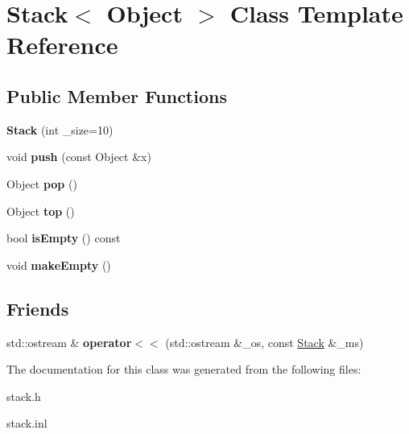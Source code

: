 \hypertarget{class_stack}{}\section{Stack$<$ Object $>$ Class Template Reference}
\label{class_stack}
\subsection*{Public Member Functions}
\begin{DoxyCompactItemize}
\item 
{\bfseries Stack} (int \+\_\+size=10)\hypertarget{class_stack_aa55bea9258de37be8c25a82b2cd8408d}{}\label{class_stack_aa55bea9258de37be8c25a82b2cd8408d}

\item 
void {\bfseries push} (const Object \&x)\hypertarget{class_stack_a7a7712fc7e216d9a5ebdff5e2eb82e64}{}\label{class_stack_a7a7712fc7e216d9a5ebdff5e2eb82e64}

\item 
Object {\bfseries pop} ()\hypertarget{class_stack_a5bcb9219ba7f9bb2d2b350278bebb5f9}{}\label{class_stack_a5bcb9219ba7f9bb2d2b350278bebb5f9}

\item 
Object {\bfseries top} ()\hypertarget{class_stack_afa4b0f96a58c0ad67396a2d3aac635e3}{}\label{class_stack_afa4b0f96a58c0ad67396a2d3aac635e3}

\item 
bool {\bfseries is\+Empty} () const \hypertarget{class_stack_a65317fd9c88beed3aa412ac162d5f897}{}\label{class_stack_a65317fd9c88beed3aa412ac162d5f897}

\item 
void {\bfseries make\+Empty} ()\hypertarget{class_stack_ae2842949fa1e42baadd9a2afc0e65994}{}\label{class_stack_ae2842949fa1e42baadd9a2afc0e65994}

\end{DoxyCompactItemize}
\subsection*{Friends}
\begin{DoxyCompactItemize}
\item 
std\+::ostream \& {\bfseries operator$<$$<$} (std\+::ostream \&\+\_\+os, const \hyperlink{class_stack}{Stack} \&\+\_\+ms)\hypertarget{class_stack_a2b18e266790513c157088dba0af45382}{}\label{class_stack_a2b18e266790513c157088dba0af45382}

\end{DoxyCompactItemize}


The documentation for this class was generated from the following files\+:\begin{DoxyCompactItemize}
\item 
stack.\+h\item 
stack.\+inl\end{DoxyCompactItemize}
